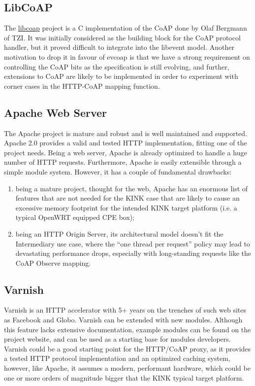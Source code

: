 \subsection{LibCoAP}
The \href{http://sourceforge.net/projects/libcoap}{libcoap} project is a C implementation of the CoAP done by Olaf Bergmann of TZI.
It was initially considered as the building block for the CoAP protocol handler, but it proved difficult to integrate into the libevent model.  Another motivation to drop it in favour of evcoap is that we have a strong requirement on controlling the CoAP bits as the specification is still evolving, and further, extensions to CoAP are likely to be implemented in order to experiment with corner cases in the HTTP-CoAP mapping function.

\subsection{Apache Web Server}
The Apache project is mature and robust and is well maintained and supported. Apache 2.0 provides a valid and tested HTTP implementation, fitting one of the project needs.  Being a web server, Apache is already optimized to handle a huge number of HTTP requests.  Furthermore, Apache is easily extensible through a simple module system.  However, it has a couple of fundamental drawbacks:
\begin{enumerate}
\item being a mature project, thought for the web, Apache has an enormous list of features that are not needed for the KINK case that are likely to cause an excessive memory footprint for the intended KINK target platform (i.e. a typical OpenWRT equipped CPE box);
\item being an HTTP Origin Server, its architectural model doesn't fit the Intermediary use case, where the ``one thread per request'' policy may lead to devastating performance drops, especially with long-standing requests like the CoAP Observe mapping.
\end{enumerate}

\subsection{Varnish}
Varnish is an HTTP accelerator with 5+ years on the trenches of such web sites as Facebook and Globo.  Varnish can be extended with new modules. Although this feature lacks extensive documentation, example modules can be found on the project website, and can be used as a starting base for modules developers.
Varnish could be a good starting point for the HTTP/CoAP proxy, as it provides a tested HTTP protocol implementation and an optimized caching system, however, like Apache, it assumes a modern, performant hardware, which could be one or more orders of magnitude bigger that the KINK typical target platform.


